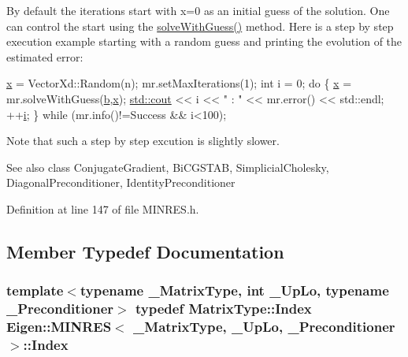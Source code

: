 By default the iterations start with x=0 as an initial guess of the solution. One can control the start using the \hyperlink{class_eigen_1_1_m_i_n_r_e_s_a79907c3bd74bed0100b3c58ba97b8091}{solve\+With\+Guess()} method. Here is a step by step execution example starting with a random guess and printing the evolution of the estimated error\+:
\begin{DoxyItemize}
\item 
\begin{DoxyCode}
\hyperlink{plot_search_8m_a9336ebf25087d91c818ee6e9ec29f8c1}{x} = VectorXd::Random(n);
mr.setMaxIterations(1);
\textcolor{keywordtype}{int} i = 0;
\textcolor{keywordflow}{do} \{
  \hyperlink{plot_search_8m_a9336ebf25087d91c818ee6e9ec29f8c1}{x} = mr.solveWithGuess(\hyperlink{run_multipole_8m_a21ad0bd836b90d08f4cf640b4c298e7c}{b},\hyperlink{plot_search_8m_a9336ebf25087d91c818ee6e9ec29f8c1}{x});
  \hyperlink{namespacemodel_a0ce25fef078a7d9d9cb7cfbabcfbc289}{std::cout} << i << \textcolor{stringliteral}{" : "} << mr.error() << std::endl;
  ++\hyperlink{_cubic_spline_intersection_8m_a6f6ccfcf58b31cb6412107d9d5281426}{i};
\} \textcolor{keywordflow}{while} (mr.info()!=Success && i<100);
\end{DoxyCode}
 Note that such a step by step excution is slightly slower.
\end{DoxyItemize}

\begin{DoxySeeAlso}{See also}
class Conjugate\+Gradient, Bi\+C\+G\+S\+T\+A\+B, Simplicial\+Cholesky, Diagonal\+Preconditioner, Identity\+Preconditioner 
\end{DoxySeeAlso}


Definition at line 147 of file M\+I\+N\+R\+E\+S.\+h.



\subsection{Member Typedef Documentation}
\hypertarget{class_eigen_1_1_m_i_n_r_e_s_a572236e313bd4bbaec98ba2a79040854}{}
\subsubsection[{Index}]{\setlength{\rightskip}{0pt plus 5cm}template$<$typename \+\_\+\+Matrix\+Type, int \+\_\+\+Up\+Lo, typename \+\_\+\+Preconditioner$>$ typedef Matrix\+Type\+::\+Index {\bf Eigen\+::\+M\+I\+N\+R\+E\+S}$<$ \+\_\+\+Matrix\+Type, \+\_\+\+Up\+Lo, \+\_\+\+Preconditioner $>$\+::{\bf Index}}\label{class_eigen_1_1_m_i_n_r_e_s_a572236e313bd4bbaec98ba2a79040854}


